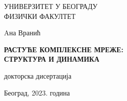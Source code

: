 
\sffamily
{}\selectfont

\begin{center}

\Large{
    УНИВЕРЗИТЕТ У БЕОГРАДУ \\
    ФИЗИЧКИ ФАКУЛТЕТ
}

\vspace{5.5cm}

\Large{
    Aна Вранић
}

\vspace{.5cm}

\LARGE{ \textbf{
    РАСТУЋЕ КОМПЛЕКСНЕ МРЕЖЕ:\\ СТРУКТУРА И ДИНАМИКА
}}

\vspace{.5cm}

\Large{
    докторска дисертација 
    
}
\vspace{9.1cm}
\Large{
    Београд, 2023. година
}
\end{center}


\pagebreak


